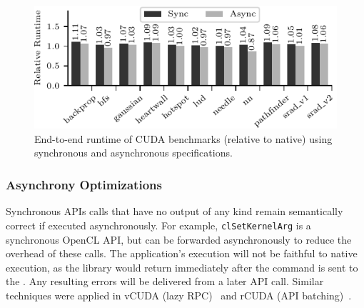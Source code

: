 \begin{figure}[!th]
	\centering
	\includegraphics[width=\columnwidth]{ava/data/end2end/end2end_async.pdf}%
	\vspace*{-.5em}
	\caption{End-to-end runtime of CUDA benchmarks (relative to native) using synchronous and asynchronous specifications.}
	\label{fig:eval_async}
	\vspace*{-1em}
\end{figure}

\subsubsection{Asynchrony Optimizations}
\label{s:opt_eval}


Synchronous APIs calls that have no output of any kind remain semantically correct if executed asynchronously.
For example, \lstinline|clSetKernelArg| is a synchronous OpenCL API,
but can be forwarded asynchronously to reduce the overhead of these calls. %
The application's execution will not be faithful to native execution, as the library would return immediately after the command is sent to the \worker.
Any resulting errors will be delivered from a later API call.
Similar techniques were applied in vCUDA (lazy RPC)~\cite{vCUDA} and rCUDA (API batching)~\cite{rCUDA}. %

